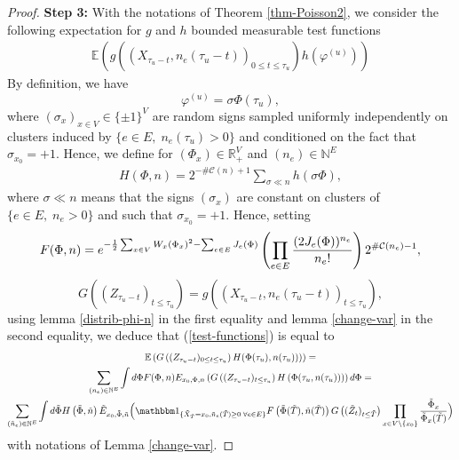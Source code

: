 \documentclass[11pt,a4paper]{amsart}
\numberwithin{equation}{section}
\def\ccc{{\mathcal C}}
\def\R{{\mathbb R}}
\def\N{{\mathbb N}}
\def\E{{\mathbb{E}}}
\def\demi{{1\over 2}}
\def\indic{{{\mathbbm 1}}}
\begin{document}
\begin{proof}
\noindent
{\bf Step 3:}
With the notations of Theorem \ref{thm-Poisson2}, we consider the following expectation for $g$ and $h$ bounded measurable test functions
\begin{eqnarray}\label{test-functions}
\E\left( g\left(\left(X_{\tau_u-t}, n_e(\tau_u-t)\right)_{0\le t\le \tau_u}\right)h(\varphi^{(u)})\right)
\end{eqnarray}
By definition, we have
$$
\varphi^{(u)}=\sigma \Phi(\tau_u),
$$
where $(\sigma_x)_{x\in V}\in \{\pm 1\}^V$ are random signs sampled uniformly independently on clusters induced by
$\{e\in E, \; n_e(\tau_u)>0\}$ and conditioned on the fact that $\sigma_{x_0}=+1$.
Hence, we define for $(\Phi_x)\in \R_+^V$ and $(n_e)\in \N^E$
\begin{eqnarray}\label{h}
H(\Phi, n)=2^{-\#\ccc(n)+1} \sum_{\sigma\ll n} h(\sigma \Phi),
\end{eqnarray}
where $\sigma\ll n$ means that the signs $(\sigma_x)$ are constant on clusters of $\{ e\in E, \; n_e>0\}$ and such that $\sigma_{x_0}=+1$.
Hence, setting
$$
F(\Phi, n)=e^{-\demi \sum_{x\in V} W_x (\Phi_x)^2-\sum_{e\in E} J_e(\Phi) }\left(\prod_{e\in E} {(2J_e(\Phi))^{n_e}\over n_e!}\right)
2^{\#\ccc(n_e)-1},
$$
$$
G\left((Z_{\tau_u-t})_{t\le\tau_u}\right)= g\left(\left(X_{\tau_u-t}, n_e(\tau_u-t)\right)_{t\le \tau_u}\right),
$$
using lemma \ref{distrib-phi-n} in the first equality and lemma \ref{change-var} in the second equality, we deduce that
(\ref{test-functions}) is equal to 
\begin{multline}
\label{eq-3.3}
\E\left( G\left((Z_{\tau_u-t})_{0\le t\le \tau_u}\right)H(\Phi(\tau_u), n(\tau_u)))\right)=
\\
\sum_{(n_e)\in \N^E} \int
d\Phi
F(\Phi, n) E_{x_0, \Phi,n}\left(G\left((Z_{\tau_u-t})_{t\le\tau_u}\right)H\left(\Phi(\tau_u, n(\tau_u))\right)\right)
d\Phi =
\\
\sum_{(\tilde n_e)\in \N^E} \int d\tilde\Phi
H\left(\tilde \Phi,\tilde n\right)
\tilde E_{x_0, \tilde \Phi, \tilde n}\Big(\indic_{\{\tilde X_{\tilde T}=x_0,\tilde n_e(\tilde T)\ge 0\; \forall e\in E\}} 
F\left(\tilde \Phi(\tilde T) , \tilde n(\tilde T)\right) G\left((\tilde Z_{t})_{t\le\tilde T}\right) \prod_{x\in V\setminus\{x_0\}} {\tilde \Phi_x\over \tilde\Phi_x(\tilde T) }
\Big)
\end{multline}
with notations of Lemma \ref{change-var}.


\end{proof}
\end{document}
